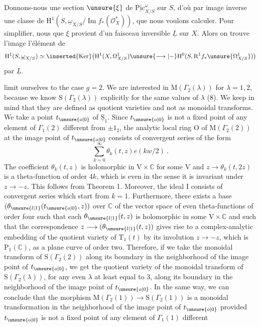 Donnons-nous une section  $\unsure{\xi}$ de $\underline{\mathrm{Pic}}^{\omega}_{X/S}$ sur $S$, d'où par image inverse une classe de $\mathrm{H}^1(S,\underline{\omega}_{X/S}/\operatorname{Im}f_*(\mathcal{O}_X^*))$, que nous voulons calculer. Pour simplifier, nous   que $\xi$ provient d'un faisceau inversible $\underline{L}$ sur $X$. Alors on trouve l'image  l'élément de
\[
\mathrm{H}^1(S,\underline{\omega}_{X/S})\simeq\inserted{\operatorname{Ker}}\bigl(\mathrm{H}^1(X,\Omega^1_{X/S})\unsure{\longrightarrow|{-}}\mathrm{H}^0(S,\mathrm{R}^1f_*\unsure{\Omega^1_{X/S}})\bigr)
\]
 par $\underline{L}$.


limit ourselves to the case $g=2$. We are interested in $\mathrm{M}(\Gamma_2(\lambda))$ for $\lambda=1,2$, because we know $\mathrm{S}(\Gamma_2(\lambda))$ explicitly for the same values of $\lambda$ (8). We keep in mind that they are defined as quotient varieties and not as monoidal transforms. We take a point $t_{\unsure{o|0}}$ of $\underline{\mathrm{S}}_1$. Since $t_{\unsure{o|0}}$ is not a fixed point of any element of $\Gamma_1(2)$ different from $\pm1_2$, the analytic local ring $\mathrm{O}$ of $\mathrm{M}(\Gamma_2(2))$ at the image point of $t_{\unsure{o|0}}$ consists of convergent series of the form
\[
\sum_{k=0}^{\infty}\theta_k(t,z)e(kw/2)\ .
\]
The coefficient $\theta_k(t,z)$ is holomorphic in $\mathrm{V}\times\mathbb{C}$ for some $\mathrm{V}$ and $z\longrightarrow\theta_k(t,2z)$ is a theta-function of order $4k$, which is even in the sense it is invariant under $z\longrightarrow-z$. This follows from Theorem 1. Moreover, the ideal $\mathrm{I}$ consists of convergent series which start from $k=1$. Furthermore, there exists a base $(\theta_{\unsure{l|1}}(t_{\unsure{o|0}},z))$ over $\mathbb{C}$ of the vector space of even theta-functions of order four such that each $\theta_{\unsure{l|1}}(t,z)$ is holomorphic in some $\mathrm{V}\times\mathbb{C}$ and such that the correspondence $z\longrightarrow(\theta_{\unsure{l|1}}(t,z))$ gives rise to a complex-analytic embedding of the quotient variety of $\mathrm{T}_1(t)$ by its involution $z\longrightarrow-z$, which is $\mathrm{P}_1(\mathbb{C})$, as a plane curve of order two. Therefore, if we take the monoidal transform of $\mathrm{S}(\Gamma_2(2))$ along its boundary in the neighborhood of the image point of $t_{\unsure{o|0}}$, we get the quotient variety of the monoidal transform of $\mathrm{S}(\Gamma_2(\lambda))$, for any even $\lambda$ at least equal to 3, along its boundary in the neighborhood of the image point of $t_{\unsure{o|0}}$. In the same way, we can conclude that the morphism $\mathrm{M}(\Gamma_2(1))\longrightarrow\mathrm{S}(\Gamma_2(1))$ is a monoidal transformation in the neighborhood of the image point of $t_{\unsure{o|0}}$ provided $t_{\unsure{o|0}}$ is not a fixed point of any element of $\Gamma_1(1)$ different

